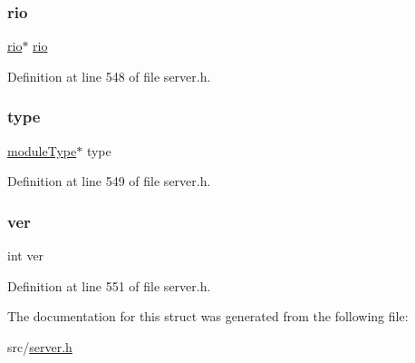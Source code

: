\mbox{\label{struct_redis_module_i_o_a9f62ec81cd12b2b2e4faebe457b15440}} 
\subsubsection{\texorpdfstring{rio}{rio}}
{\footnotesize\ttfamily \hyperlink{rio_8h_a048ce06d2f559006ef67f885ceb2c1ca}{rio}$\ast$ \hyperlink{rio_8h_a048ce06d2f559006ef67f885ceb2c1ca}{rio}}



Definition at line 548 of file server.\+h.

\mbox{\label{struct_redis_module_i_o_a05eee39e39e34439ea77af35b597b1ae}} 
\subsubsection{\texorpdfstring{type}{type}}
{\footnotesize\ttfamily \hyperlink{server_8h_a3e81a33920e783a6b35dedfd7bdb6a2c}{module\+Type}$\ast$ type}



Definition at line 549 of file server.\+h.

\mbox{\label{struct_redis_module_i_o_a88ca8dd6d8b1535e6ba06c4d988c525b}} 
\subsubsection{\texorpdfstring{ver}{ver}}
{\footnotesize\ttfamily int ver}



Definition at line 551 of file server.\+h.



The documentation for this struct was generated from the following file\+:\begin{DoxyCompactItemize}
\item 
src/\hyperlink{server_8h}{server.\+h}\end{DoxyCompactItemize}
